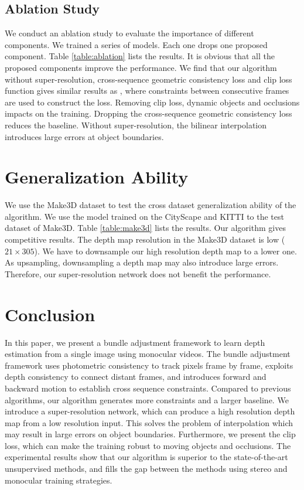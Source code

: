 \documentclass[10pt,twocolumn,letterpaper]{article}
\begin{document}
\subsection{Ablation Study}
We conduct an ablation study to evaluate the importance of different components. We trained a series of models. Each one drops one proposed component.  Table \ref{table:ablation} lists the results. It is obvious that all the proposed components improve the performance. We find that our algorithm without super-resolution, cross-sequence geometric consistency loss and clip loss function gives similar results as \cite{yin2018geonet}, where constraints between consecutive frames are used to construct the loss. Removing clip loss, dynamic objects and occlusions  impacts on the training. Dropping the cross-sequence geometric consistency loss reduces the baseline. Without super-resolution, the bilinear interpolation  introduces large errors at object boundaries. 



\section{Generalization Ability}
We use the Make3D dataset \cite{saxena2009make3d} to test the cross dataset generalization ability of the algorithm. We use the model trained on the CityScape and KITTI to the test dataset of Make3D. Table \ref{table:make3d} lists the results. Our algorithm gives competitive results. The depth map resolution in the  Make3D dataset is low ($ 21 \times 305 $).  We have to downsample our high resolution depth map to a lower one. As upsampling, downsampling a depth map may also introduce large errors. Therefore, our super-resolution network does not benefit the performance. 








\section{Conclusion}
In this paper, we present a bundle adjustment framework to learn depth estimation from a single image using monocular videos. The  bundle adjustment framework uses photometric consistency to track pixels frame by frame, exploits depth consistency to connect distant frames, and introduces forward and backward motion to establish cross sequence constraints. Compared to previous algorithms, our algorithm generates more constraints and a larger baseline. We introduce a super-resolution network, which can produce a high resolution depth map  from a low resolution input. This solves the problem of interpolation which may result in large errors on object boundaries. Furthermore, we present the clip loss, which can make the training robust to moving objects and occlusions. The experimental results show that our algorithm is superior to the state-of-the-art unsupervised methods, and fills the gap between the methods using stereo and monocular training strategies. 



{\small


}
\end{document}
